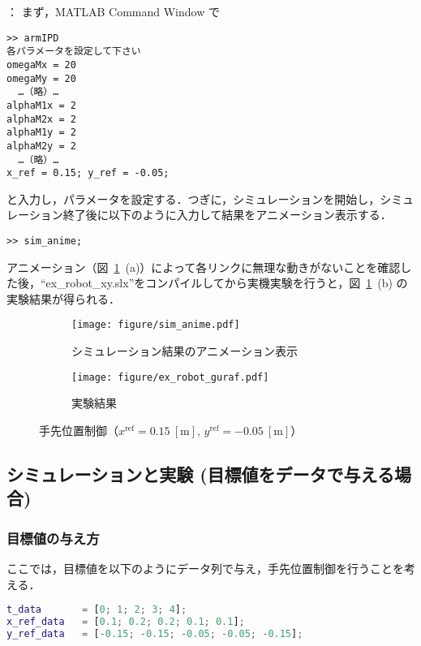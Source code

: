 ： まず，MATLAB Command Window で
\begin{verbatim}
>> armIPD
各パラメータを設定して下さい
omegaMx = 20
omegaMy = 20
  …（略）…
alphaM1x = 2
alphaM2x = 2
alphaM1y = 2
alphaM2y = 2
  …（略）…
x_ref = 0.15; y_ref = -0.05;
\end{verbatim}

と入力し，パラメータを設定する．つぎに，シミュレーションを開始し，シミュレーション終了後に以下のように入力して結果をアニメーション表示する．
\begin{verbatim}
>> sim_anime;
\end{verbatim}

アニメーション（図~\ref{fig:xy_animation}~(a)）によって各リンクに無理な動きがないことを確認した後，``ex\_robot\_xy.slx''をコンパイルしてから実機実験を行うと，図~\ref{fig:xy_animation}~(b) の実験結果が得られる．

\begin{figure}[H]
    \centering
    \begin{subfigure}[b]{0.45\linewidth}
        \centering
        \texttt{[image: figure/sim\_anime.pdf]}
        \caption{シミュレーション結果のアニメーション表示}
    \end{subfigure}
    \begin{subfigure}[b]{0.45\linewidth}
        \centering
        \texttt{[image: figure/ex\_robot\_guraf.pdf]}
        \caption{実験結果}
    \end{subfigure}
    \caption{手先位置制御（$x^{\mathrm{ref}}=0.15\ \mathrm{[m]}$, $y^{\mathrm{ref}}=-0.05\ \mathrm{[m]}$）}
    \label{fig:xy_animation}
\end{figure}

\subsection{シミュレーションと実験 (目標値をデータで与える場合)}
\subsubsection{目標値の与え方}
ここでは，目標値を以下のようにデータ列で与え，手先位置制御を行うことを考える．

\begin{lstlisting}[language=Matlab]
t_data       = [0; 1; 2; 3; 4];
x_ref_data   = [0.1; 0.2; 0.2; 0.1; 0.1];
y_ref_data   = [-0.15; -0.15; -0.05; -0.05; -0.15];
\end{lstlisting}


